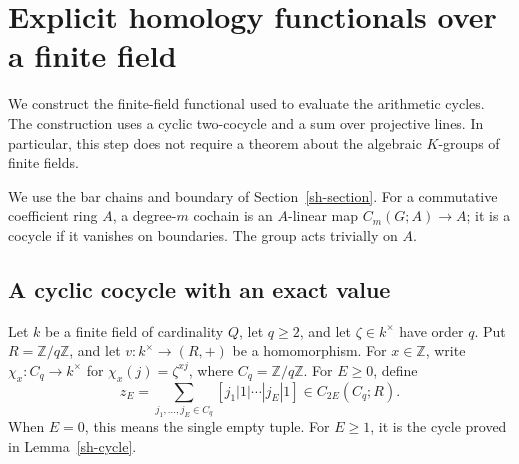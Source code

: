 \section{Explicit homology functionals over a finite field}
\label{sf-section}

We construct the finite-field functional used to evaluate
the arithmetic cycles.  The construction uses a cyclic
two-cocycle and a sum over projective lines.  In particular,
this step does not require a theorem about the algebraic
\(K\)-groups of finite fields.

We use the bar chains and boundary of
Section~\ref{sh-section}.  For a commutative coefficient
ring \(A\), a degree-\(m\) cochain is an \(A\)-linear
map \(C_m(G;A)\to A\); it is a cocycle if it vanishes
on boundaries.  The group acts trivially on \(A\).

\subsection{A cyclic cocycle with an exact value}

Let \(k\) be a finite field of cardinality \(Q\),
let \(q\ge2\), and let \(\zeta\in k^\times\) have
order \(q\).  Put \(R=\mathbb Z/q\mathbb Z\), and
let \(v:k^\times\to(R,+)\) be a homomorphism.
For \(x\in\mathbb Z\), write
\(\chi_x:C_q\to k^\times\) for
\(\chi_x(j)=\zeta^{xj}\), where \(C_q=\mathbb Z/q\mathbb Z\).
For \(E\ge0\), define
\[
 z_E=\sum_{j_1,\ldots,j_E\in C_q}
             [j_1|1|\cdots|j_E|1]\in C_{2E}(C_q;R).
\]
When \(E=0\), this means the single empty tuple.
For \(E\ge1\), it is the cycle proved in
Lemma~\ref{sh-cycle}.

